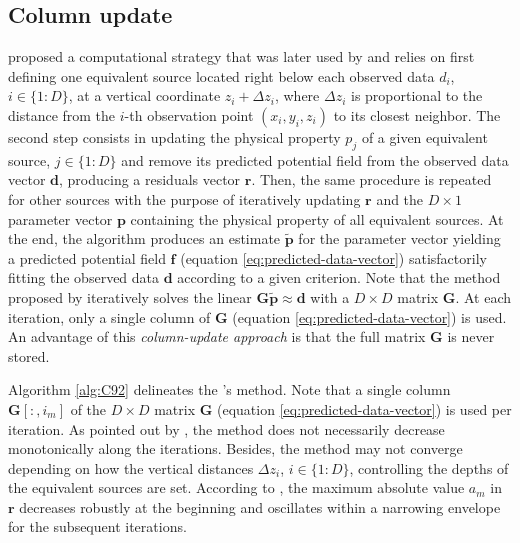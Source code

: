 \subsection{Column update}

\cite{cordell1992} proposed a computational strategy that was later used by \cite{guspi-novara2009} and relies on
first defining one equivalent source located right below each observed data $d_{i}$, $i \in \{1:D\}$, at a vertical
coordinate $z_{i} + \Delta z_{i}$, where $\Delta z_{i}$ is proportional to the distance from the $i$-th observation point 
$(x_{i}, y_{i}, z_{i})$ to its closest neighbor.
The second step consists in updating the physical property $p_{j}$ of a given equivalent source, $j \in \{1:D\}$ and 
remove its predicted potential field from the observed data vector $\mathbf{d}$, producing a residuals vector $\mathbf{r}$. 
Then, the same procedure is repeated for other sources with the purpose of iteratively updating $\mathbf{r}$ and the
$D \times 1$ parameter vector $\mathbf{p}$ containing the physical property of all equivalent sources.
At the end, the algorithm produces an estimate $\tilde{\mathbf{p}}$ for the parameter vector yielding a predicted
potential field $\mathbf{f}$ (equation \ref{eq:predicted-data-vector}) satisfactorily fitting the observed data
$\mathbf{d}$ according to a given criterion.
Note that the method proposed by \cite{cordell1992} iteratively solves the linear $\mathbf{G} \tilde{\mathbf{p}} \approx \mathbf{d}$
with a $D \times D$ matrix $\mathbf{G}$. At each iteration, only a single column of $\mathbf{G}$ (equation \ref{eq:predicted-data-vector}) 
is used.
An advantage of this \textit{column-update approach} is that the full matrix $\mathbf{G}$ is never stored.

Algorithm \ref{alg:C92} delineates the \citeauthor{cordell1992}'s method.
Note that a single column $\mathbf{G}[:, i_{m}]$ of the $D \times D$ matrix $\mathbf{G}$ (equation \ref{eq:predicted-data-vector})
is used per iteration.
As pointed out by \cite{cordell1992}, the method does not necessarily decrease monotonically along the iterations.
Besides, the method may not converge depending on how the vertical distances $\Delta z_{i}$, $i \in \{1:D\}$, 
controlling the depths of the equivalent sources are set.
According to \cite{cordell1992}, the maximum absolute value $a_{m}$ in $\mathbf{r}$ decreases robustly at the beginning 
and oscillates within a narrowing envelope for the subsequent iterations.


